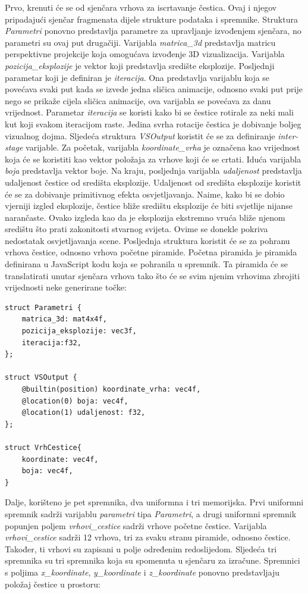 \documentclass{foi}
\begin{document}
Prvo, krenuti će se od sjenčara vrhova za iscrtavanje čestica. Ovaj i njegov pripadajući sjenčar fragmenata dijele strukture podataka i spremnike. Struktura \textit{Parametri} ponovno predstavlja parametre za upravljanje izvođenjem sjenčara, no parametri su ovaj put drugačiji. Varijabla \textit{matrica\_3d} predstavlja matricu perspektivne projekcije koja omogućava izvođenje 3D vizualizacija. Varijabla \textit{pozicija\_eksplozije} je vektor koji predstavlja središte eksplozije. Posljednji parametar koji je definiran je \textit{iteracija}. Ona predstavlja varijablu koja se povećava svaki put kada se izvede jedna sličica animacije, odnosno svaki put prije nego se prikaže cijela sličica animacije, ova varijabla se povećava za danu vrijednost. Parametar \textit{iteracija} se koristi kako bi se čestice rotirale za neki mali kut koji svakom iteracijom raste. Jedina svrha rotacije čestica je dobivanje boljeg vizualnog dojma. Sljedeća struktura \textit{VSOutput} koristit će se za definiranje \textit{inter-stage} varijable. Za početak, varijabla \textit{koordinate\_vrha} je označena kao vrijednost koja će se koristiti kao vektor položaja za vrhove koji će se crtati. Iduća varijabla \textit{boja} predstavlja vektor boje. Na kraju, posljednja varijabla \textit{udaljenost} predstavlja udaljenost čestice od središta eksplozije. Udaljenost od središta eksplozije koristit će se za dobivanje primitivnog efekta osvjetljavanja. Naime, kako bi se dobio vjerniji izgled eksplozije, čestice bliže središtu eksplozije će biti svjetlije nijanse narančaste. Ovako izgleda kao da je eksplozija ekstremno vruća bliže njenom središtu što prati zakonitosti stvarnog svijeta. Ovime se donekle pokriva nedostatak osvjetljavanja scene. Posljednja struktura koristit će se za pohranu vrhova čestice, odnosno vrhova početne piramide. Početna piramida je piramida definirana u JavaScript kodu koja se pohranila u spremnik. Ta piramida će se translatirati unutar sjenčara vrhova tako što će se svim njenim vrhovima zbrojiti vrijednosti neke generirane točke:

\begin{verbatim}
struct Parametri {
	matrica_3d: mat4x4f,
	pozicija_eksplozije: vec3f,
	iteracija:f32,
};

struct VSOutput {
	@builtin(position) koordinate_vrha: vec4f,
	@location(0) boja: vec4f,
	@location(1) udaljenost: f32,
};

struct VrhCestice{
	koordinate: vec4f,
	boja: vec4f,
}
\end{verbatim} 


Dalje, korišteno je pet spremnika, dva uniformna i tri memorijska. Prvi uniformni spremnik sadrži varijablu \textit{parametri} tipa \textit{Parametri}, a drugi uniformni spremnik popunjen poljem \textit{vrhovi\_cestice} sadrži vrhove početne čestice. Varijabla \textit{vrhovi\_cestice} sadrži 12 vrhova, tri za svaku stranu piramide, odnosno čestice. Također, ti vrhovi su zapisani u polje određenim redoslijedom. Sljedeća tri spremnika su tri spremnika koja su spomenuta u sjenčaru za izračune. Spremnici s poljima \textit{x\_koordinate}, \textit{y\_koordinate} i \textit{z\_koordinate} ponovno predstavljaju položaj čestice u prostoru:
\end{document}
